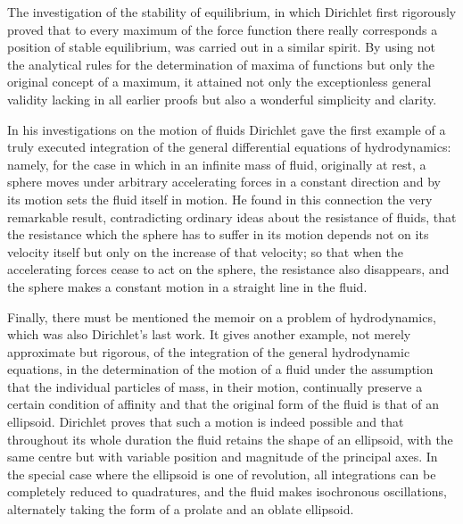 \documentclass[11pt]{article}
\begin{document}
The investigation of the stability of equilibrium, in which Dirichlet first rigorously proved that to every maximum of the force function there really corresponds a position of stable equilibrium, was carried out in a similar spirit. By using not the analytical rules for the determination of maxima of functions but only the original concept of a maximum, it attained not only the exceptionless general validity lacking in all earlier proofs but also a wonderful simplicity and clarity.

In his investigations on the motion of fluids Dirichlet gave the first example of a truly executed integration of the general differential equations of hydrodynamics: namely, for the case in which in an infinite mass of fluid, originally at rest, a sphere moves under arbitrary accelerating forces in a constant direction and by its motion sets the fluid itself in motion. He found in this connection the very remarkable result, contradicting ordinary ideas about the resistance of fluids, that the resistance which the sphere has to suffer in its motion depends not on its velocity itself but only on the increase of that velocity; so that when the accelerating forces cease to act on the sphere, the resistance also disappears, and the sphere makes a constant motion in a straight line in the fluid.

Finally, there must be mentioned the memoir on a problem of hydrodynamics, which was also Dirichlet's last work. It gives another example, not merely approximate but rigorous, of the integration of the general hydrodynamic equations, in the determination of the motion of a fluid under the assumption that the individual particles of mass, in their motion, continually preserve a certain condition of affinity and that the original form of the fluid is that of an ellipsoid. Dirichlet proves that such a motion is indeed possible and that throughout its whole duration the fluid retains the shape of an ellipsoid, with the same centre but with variable position and magnitude of the principal axes. In the special case where the ellipsoid is one of revolution, all integrations can be completely reduced to quadratures, and the fluid makes isochronous oscillations, alternately taking the form of a prolate and an oblate ellipsoid.
\end{document}
